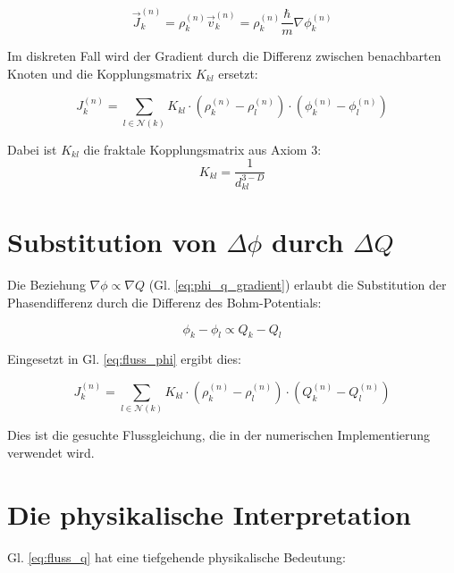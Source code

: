 \[
\vec{J}_k^{(n)} = \rho_k^{(n)} \vec{v}_k^{(n)} 
= \rho_k^{(n)} \frac{\hbar}{m} \nabla \phi_k^{(n)}
\]

Im diskreten Fall wird der Gradient durch die Differenz zwischen benachbarten Knoten 
und die Kopplungsmatrix \( K_{kl} \) ersetzt:

\[
J_k^{(n)} = \sum_{l \in \mathcal{N}(k)} K_{kl} \cdot \left( \rho_k^{(n)} - \rho_l^{(n)} \right) \cdot \left( \phi_k^{(n)} - \phi_l^{(n)} \right)
\]
\label{eq:fluss_phi}

Dabei ist \( K_{kl} \) die fraktale Kopplungsmatrix aus Axiom 3:
\[
K_{kl} = \frac{1}{d_{kl}^{3-D}}
\]

\section{Substitution von \( \Delta \phi \) durch \( \Delta Q \)}

Die Beziehung \( \nabla \phi \propto \nabla Q \) (Gl. \ref{eq:phi_q_gradient}) 
erlaubt die Substitution der Phasendifferenz durch die Differenz des Bohm-Potentials:

\[
\phi_k - \phi_l \propto Q_k - Q_l
\]

Eingesetzt in Gl. \ref{eq:fluss_phi} ergibt dies:

\[
J_k^{(n)} = \sum_{l \in \mathcal{N}(k)} K_{kl} \cdot \left( \rho_k^{(n)} - \rho_l^{(n)} \right) \cdot \left( Q_k^{(n)} - Q_l^{(n)} \right)
\]
\label{eq:fluss_q}

Dies ist die gesuchte Flussgleichung, die in der numerischen Implementierung verwendet wird.

\section{Die physikalische Interpretation}

Gl. \ref{eq:fluss_q} hat eine tiefgehende physikalische Bedeutung:

